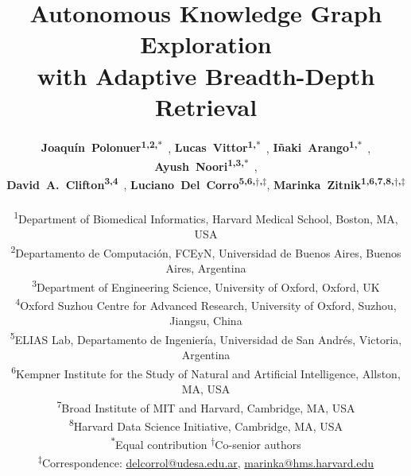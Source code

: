 \documentclass[11pt]{article}
\title{
Autonomous Knowledge Graph Exploration \\ with Adaptive Breadth-Depth Retrieval
}
\author{
\textbf{Joaqu\'in~Polonuer\textsuperscript{1,2,$\ast$}}~\orcidlink{0009-0007-8613-6126}, 
\textbf{Lucas~Vittor\textsuperscript{1,$\ast$}}~\orcidlink{0009-0002-6978-0482},
\textbf{I\~naki~Arango\textsuperscript{1,$\ast$}}~\orcidlink{0009-0002-1443-2325},
\textbf{Ayush~Noori\textsuperscript{1,3,$\ast$}}~\orcidlink{0000-0003-1420-1236},\\
\textbf{David~A.~Clifton\textsuperscript{3,4}}~\orcidlink{0000-0002-9848-8555},
\textbf{Luciano~Del~Corro\textsuperscript{5,6,$\dagger$,$\ddagger$}},
\textbf{Marinka~Zitnik\textsuperscript{1,6,7,8,$\dagger$,$\ddagger$}}~\orcidlink{0000-0001-8530-7228} \\[1mm]
\textsuperscript{1}Department of Biomedical Informatics, Harvard Medical School, Boston, MA, USA \\
\textsuperscript{2}Departamento de Computaci\'on, FCEyN, Universidad de Buenos Aires, Buenos Aires, Argentina \\
\textsuperscript{3}Department of Engineering Science, University of Oxford, Oxford, UK \\
\textsuperscript{4}Oxford Suzhou Centre for Advanced Research, University of Oxford, Suzhou, Jiangsu, China \\
\textsuperscript{5}ELIAS Lab, Departamento de Ingenier\'ia, Universidad de San Andr\'es, Victoria, Argentina \\
\textsuperscript{6}Kempner Institute for the Study of Natural and Artificial Intelligence, Allston, MA, USA \\
\textsuperscript{7}Broad Institute of MIT and Harvard, Cambridge, MA, USA \\
\textsuperscript{8}Harvard Data Science Initiative, Cambridge, MA, USA \\
\textsuperscript{$\ast$}Equal contribution\; \textsuperscript{$\dagger$}Co-senior authors\\
\textsuperscript{$\ddagger$}Correspondence: \href{mailto:delcorrol@udesa.edu.ar}{delcorrol@udesa.edu.ar}, \href{mailto:marinka@hms.harvard.edu}{marinka@hms.harvard.edu}
}
\theoremstyle{plain}
\theoremstyle{definition}
\theoremstyle{remark}
\begin{document}
\maketitle


\FigMain



\TabStarkResults









\clearpage
\appendix

\end{document}
